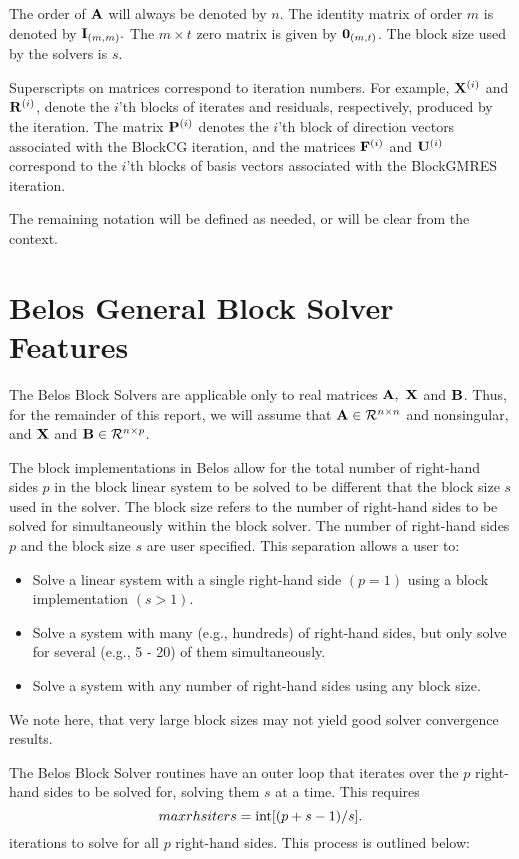 \documentclass{article}
\newcommand{\bA}{{\bf A}}
\newcommand{\bB}{{\bf B}}
\newcommand{\bF}{{\bf F}}
\newcommand{\bP}{{\bf P}}
\newcommand{\bR}{{\bf R}}
\newcommand{\bU}{{\bf U}}
\newcommand{\bX}{{\bf X}}
\newcommand{\dm}{\begin{displaymath}}
\newcommand{\edm}{\end{displaymath}}
\begin{document}
The order of $\bA$ will always be denoted by $n.$ The identity
matrix of order $m$ is denoted by ${\bf I}_{(m,m)}.$ The $m \times
t$ zero matrix is given by ${\bf 0}_{(m,t)}$. The block size used
by the solvers is $s$.

Superscripts on matrices correspond to iteration numbers. For
example, $\bX^{(i)}$ and $\bR^{(i)}$, denote the $i$'th blocks of
iterates and residuals, respectively, produced by the iteration.
The matrix $\bP^{(i)}$ denotes the $i$'th block of direction
vectors associated with the BlockCG iteration, and the matrices
$\bF^{(i)}$ and $\bU^{(i)}$ correspond to the $i$'th blocks of
basis vectors associated with the BlockGMRES iteration.

The remaining notation will be defined as needed, or will be clear
from the context.


\section{Belos General Block Solver Features}

The Belos Block Solvers are applicable only to real matrices $\bA,
~ \bX$ and $\bB$. Thus, for the remainder of this report, we will
assume that $\bA \in {\cal R}^{n \times n}$ and nonsingular, and
$\bX$ and $\bB \in {\cal R}^{n \times p}$.

The block implementations in Belos allow for the total number of
right-hand sides $p$ in the block linear system to be solved to be
different that the block size $s$ used in the solver. The block
size refers to the number of right-hand sides to be solved for
simultaneously within the block solver. The number of right-hand
sides $p$ and the block size $s$ are user specified. This
separation allows a user to:
\begin{itemize}
\item Solve a linear system with a single right-hand side $(p=1)$
using a block implementation $(s>1)$.
\item Solve a system with many (e.g., hundreds) of
right-hand sides, but only solve for several (e.g., 5 - 20) of
them simultaneously.
\item Solve a system with any number of right-hand sides using any
block size.
\end{itemize}
We note here, that very large block sizes may not yield good
solver convergence results. \vspace{0.2in}

The Belos Block Solver routines have an outer loop that iterates
over the $p$ right-hand sides to be solved for, solving them $s$
at a time. This requires
 \dm
 maxrhsiters = {\rm int}[(p+s-1)/s].
 \edm
iterations to solve for all $p$ right-hand sides. This process is
outlined below:
 \vspace{0.2in}
\end{document}
